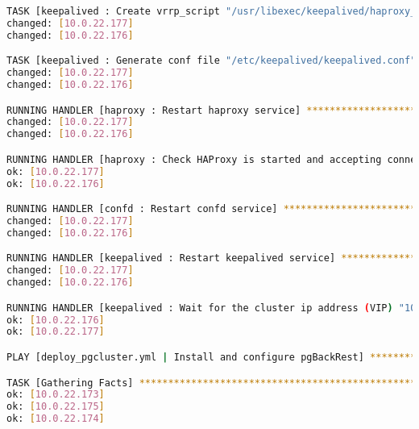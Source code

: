 \begin{flushleft}
\begin{lstlisting}[language=bash, caption=Deploy - Anhang - Deployt,captionpos=b,label={lst:deploy-appendix-deployt},breaklines=true]
TASK [keepalived : Create vrrp_script "/usr/libexec/keepalived/haproxy_check.sh"] *********************************************************************************************************************************
changed: [10.0.22.177]
changed: [10.0.22.176]

TASK [keepalived : Generate conf file "/etc/keepalived/keepalived.conf"] ******************************************************************************************************************************************
changed: [10.0.22.177]
changed: [10.0.22.176]

RUNNING HANDLER [haproxy : Restart haproxy service] ***************************************************************************************************************************************************************
changed: [10.0.22.177]
changed: [10.0.22.176]

RUNNING HANDLER [haproxy : Check HAProxy is started and accepting connections] ************************************************************************************************************************************
ok: [10.0.22.177]
ok: [10.0.22.176]

RUNNING HANDLER [confd : Restart confd service] *******************************************************************************************************************************************************************
changed: [10.0.22.177]
changed: [10.0.22.176]

RUNNING HANDLER [keepalived : Restart keepalived service] *********************************************************************************************************************************************************
changed: [10.0.22.177]
changed: [10.0.22.176]

RUNNING HANDLER [keepalived : Wait for the cluster ip address (VIP) "10.0.22.178" is running] *********************************************************************************************************************
ok: [10.0.22.176]
ok: [10.0.22.177]

PLAY [deploy_pgcluster.yml | Install and configure pgBackRest] ****************************************************************************************************************************************************

TASK [Gathering Facts] ********************************************************************************************************************************************************************************************
ok: [10.0.22.173]
ok: [10.0.22.175]
ok: [10.0.22.174]


\end{lstlisting}
\end{flushleft}
